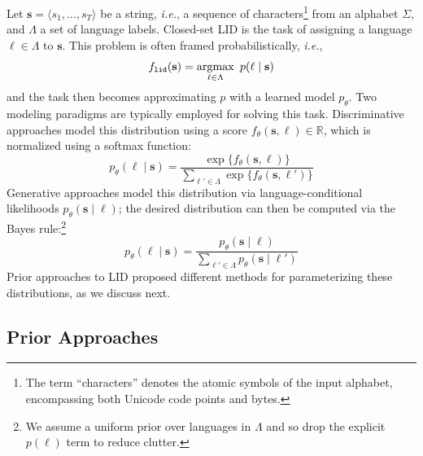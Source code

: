 \documentclass{article}
\makeatletter
\newcommand{\ie}{\emph{i.e.}\@\xspace}
\newcommand{\R}{\mathbb{R}}
\newcommand{\writemore}{{\color{red} ... (write more)}\xspace}
\newcommand{\stringunit}{s}
\newcommand{\str}{\mathbf{\stringunit}}
\newcommand{\stralphabet}{\Sigma}
\newcommand{\lang}{\ell}
\newcommand{\languages}{\Lambda}
\newcommand{\model}{p_{\theta}}
\DeclareMathOperator*{\argmax}{\mathrm{argmax}}
\makeatother
\begin{document}
Let $\str=\langle\stringunit_1, \dots, \stringunit_T\rangle$ be a string, \ie, a sequence of characters\footnote{The term \enquote{characters} denotes the atomic symbols of the input alphabet, encompassing both Unicode code points and bytes.}
from an alphabet $\stralphabet$, and $\languages$ a set of language labels. 
Closed-set LID is the task of assigning a language $\lang\in\languages$ to $\str$. 
This problem is often framed probabilistically, \ie,
\begin{equation}\label{eq:lang-id}
    \lidfunc(\str) = \argmax_{\lang\in\languages} \,\,p(\lang\mid\str)
\end{equation}
and the task then becomes approximating $p$ with a learned model $\model$. 
Two modeling paradigms are typically employed for solving this task. Discriminative approaches model this distribution using a score $f_\theta(\str,\lang)\in\R$, which is normalized using a softmax function:
\begin{equation}\label{eq:discriminative}
    \model(\lang \mid \str) = \frac{\exp\{f_\theta(\str,\lang)\}}{\sum_{\lang'\in\languages}\exp\{f_\theta(\str,\lang')\}}
\end{equation}
Generative approaches model this distribution via language-conditional likelihoods $\model(\str\mid \lang)$; the desired distribution can then be computed via the Bayes rule:\footnote{We assume a uniform prior over languages in $\languages$ and so drop the explicit $p(\lang)$ term to reduce clutter. }
\begin{equation}\label{eq:bayes}
\model(\lang \mid \str) = \frac{\model(\str \mid \lang)}{\sum_{\lang'\in\languages} \model(\str \mid \lang')}
\end{equation} 
Prior approaches to LID proposed different methods for parameterizing these distributions, as we discuss next.



\subsection{Prior Approaches}
\end{document}

